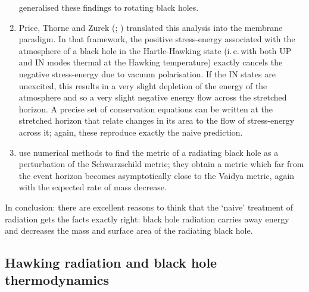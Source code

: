 \documentclass[12pt]{article}
\newcommand{\iec}{\mbox{i.\,e.\,}}
\begin{document}
\begin{enumerate}
\begin{enumerate}
\end{enumerate}
 generalised these findings to rotating black holes.
\item Price, Thorne and Zurek (; ) translated this analysis into the membrane paradigm. In that framework, the positive stress-energy associated with the atmosphere of a black hole in the Hartle-Hawking state (\iec with both UP and IN modes thermal at the Hawking temperature) exactly cancels the negative stress-energy due to vacuum polarisation. If the IN states are unexcited, this results in a very slight depletion of the energy of the atmosphere and so a very slight negative energy flow across the stretched horizon. A precise set of conservation equations can be written at the stretched horizon that relate changes in its area to the flow of stress-energy across it; again, these reproduce exactly the naive prediction.
\item {} use numerical methods to find the metric of a radiating black hole as a perturbation of the Schwarzschild metric; they obtain a metric which far from the event horizon becomes asymptotically close to the Vaidya metric, again with the expected rate of mass decrease.
\end{enumerate}
In conclusion: there are excellent reasons to think that the `naive' treatment of radiation gets the facts exactly right: black hole radiation carries away energy and decreases the mass and surface area of the radiating black hole.

\subsection{Hawking radiation and black hole thermodynamics}\label{blackhole-thermalcontact}
\end{document}
